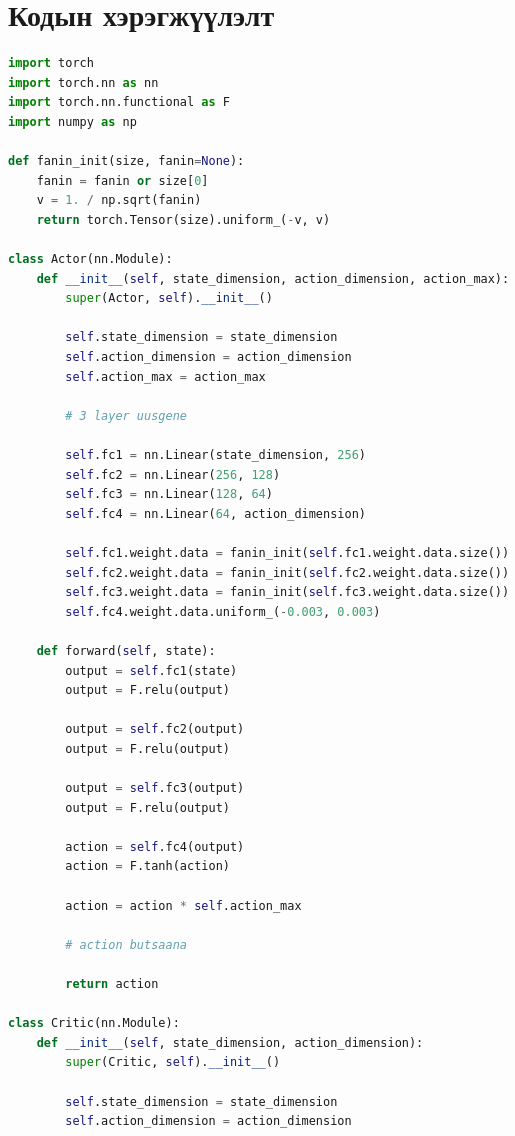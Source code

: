 \documentclass[12pt,A4]{report}
\begin{document}
\chapter{Кодын хэрэгжүүлэлт}

\begin{lstlisting}[language=Python, caption=models.py, frame=single]
import torch
import torch.nn as nn
import torch.nn.functional as F
import numpy as np

def fanin_init(size, fanin=None):
    fanin = fanin or size[0]
    v = 1. / np.sqrt(fanin)
    return torch.Tensor(size).uniform_(-v, v)

class Actor(nn.Module):
    def __init__(self, state_dimension, action_dimension, action_max):
        super(Actor, self).__init__()

        self.state_dimension = state_dimension
        self.action_dimension = action_dimension
        self.action_max = action_max

        # 3 layer uusgene

        self.fc1 = nn.Linear(state_dimension, 256)
        self.fc2 = nn.Linear(256, 128)
        self.fc3 = nn.Linear(128, 64)
        self.fc4 = nn.Linear(64, action_dimension)
        
        self.fc1.weight.data = fanin_init(self.fc1.weight.data.size())
        self.fc2.weight.data = fanin_init(self.fc2.weight.data.size())
        self.fc3.weight.data = fanin_init(self.fc3.weight.data.size())
        self.fc4.weight.data.uniform_(-0.003, 0.003)

    def forward(self, state):
        output = self.fc1(state)
        output = F.relu(output)

        output = self.fc2(output)
        output = F.relu(output)

        output = self.fc3(output)
        output = F.relu(output)

        action = self.fc4(output)
        action = F.tanh(action)

        action = action * self.action_max

        # action butsaana

        return action

class Critic(nn.Module):
    def __init__(self, state_dimension, action_dimension):
        super(Critic, self).__init__()

        self.state_dimension = state_dimension
        self.action_dimension = action_dimension
        

\end{lstlisting}
\end{document}
